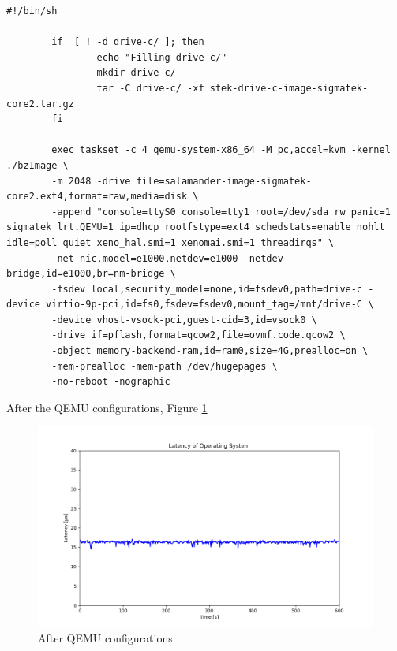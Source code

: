 \documentclass[MMR,Master,english]{twbook}
\begin{document}
	\vspace{1em}
	\begin{minipage}{\linewidth}
		\begin{lstlisting}[name={Tuned QEMU script for starting Salamander 4 virtualization},label={script:qemu_def_tuned}]
		#!/bin/sh

		if  [ ! -d drive-c/ ]; then
				echo "Filling drive-c/"
				mkdir drive-c/
				tar -C drive-c/ -xf stek-drive-c-image-sigmatek-core2.tar.gz
		fi
			
		exec taskset -c 4 qemu-system-x86_64 -M pc,accel=kvm -kernel ./bzImage \
		-m 2048 -drive file=salamander-image-sigmatek-core2.ext4,format=raw,media=disk \
		-append "console=ttyS0 console=tty1 root=/dev/sda rw panic=1 sigmatek_lrt.QEMU=1 ip=dhcp rootfstype=ext4 schedstats=enable nohlt idle=poll quiet xeno_hal.smi=1 xenomai.smi=1 threadirqs" \
		-net nic,model=e1000,netdev=e1000 -netdev bridge,id=e1000,br=nm-bridge \
		-fsdev local,security_model=none,id=fsdev0,path=drive-c -device virtio-9p-pci,id=fs0,fsdev=fsdev0,mount_tag=/mnt/drive-C \
		-device vhost-vsock-pci,guest-cid=3,id=vsock0 \
		-drive if=pflash,format=qcow2,file=ovmf.code.qcow2 \
		-object memory-backend-ram,id=ram0,size=4G,prealloc=on \
		-mem-prealloc -mem-path /dev/hugepages \
		-no-reboot -nographic
	\end{lstlisting}
	\end{minipage}


	After the QEMU configurations, Figure \ref{fig:max_latency_rt_kernelparam_host_qemu}
	
	\begin{figure}[H]
		\centering
		\includegraphics[width=1.0\columnwidth]{masterthesis-documentation/docs/sigmatek/xenomai/6rt_kernelparam_host_qemu/max_latency_rt_kernelparam_host_qemu/max_latency_rt_kernelparam_host_qemu.png}
		\caption[After QEMU configurations]{After QEMU configurations}
		\label{fig:max_latency_rt_kernelparam_host_qemu}
	\end{figure}
\end{document}
